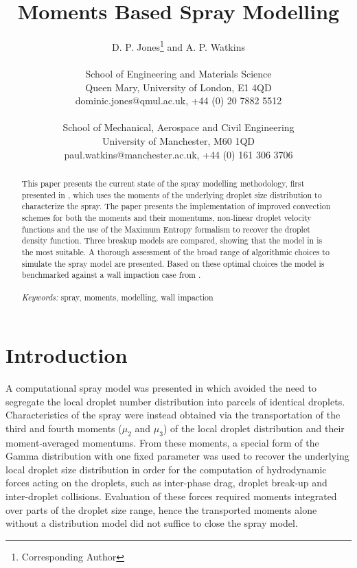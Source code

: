 \documentclass[a4paper,10pt]{article}
\title{Moments Based Spray Modelling}
\author{D. P. Jones\footnote{Corresponding Author} and A. P. Watkins \\
\\
School of Engineering and Materials Science\\
Queen Mary, University of London, E1 4QD \\
dominic.jones@qmul.ac.uk, +44 (0) 20 7882 5512 \\
\\
School of Mechanical, Aerospace and Civil Engineering \\
University of Manchester, M60 1QD \\
paul.watkins@manchester.ac.uk, +44 (0) 161 306 3706
}
\date{}
\begin{document}
\maketitle


\begin{abstract}
This paper presents the current state of the spray modelling methodology, first presented
in \cite{beck2002,beck2003}, which uses the moments of the
underlying droplet size distribution to characterize the spray. The paper presents the implementation of improved convection schemes
for both the moments and their momentums, non-linear droplet velocity functions and the use of the Maximum Entropy
formalism to recover the droplet density function. Three breakup models are compared, showing that the model
in \cite{hsiang1992}
is the most
suitable. A thorough assessment of the broad range of algorithmic choices to simulate the spray model are presented. Based on these optimal choices the model is benchmarked against a wall impaction case from
\cite{park2004}.
%
\\\\{\noindent \emph{Keywords:} spray, moments, modelling, wall impaction}
\end{abstract}



\section{Introduction}
A computational spray model was presented in \cite{beck2003} which avoided the need to
segregate the local droplet number distribution into parcels of identical droplets. Characteristics
of the spray were instead obtained via the transportation of the third and fourth moments ($\mu_2$ and $\mu_3$) of the local droplet distribution and their moment-averaged momentums. From these moments, a special form of the Gamma distribution with one fixed parameter was used to recover the underlying local droplet size distribution in order for the computation of hydrodynamic forces acting on the droplets, such as inter-phase drag, droplet break-up and inter-droplet collisions. Evaluation of these forces required moments integrated over parts of the droplet size range, hence the transported moments alone without a distribution model did not suffice to close the spray model.
\end{document}
